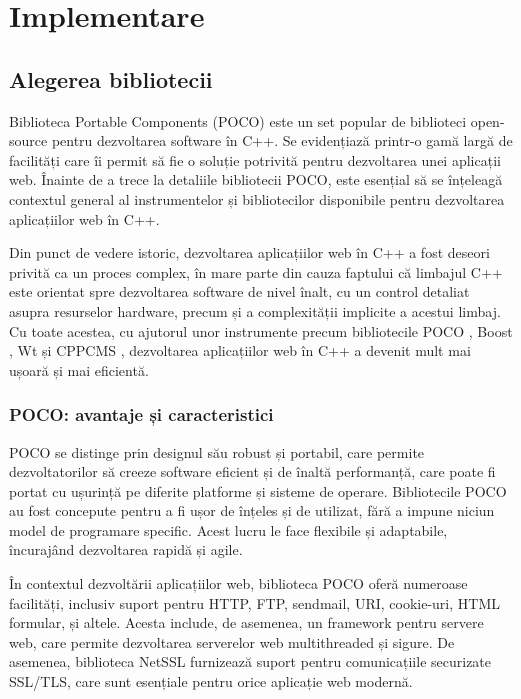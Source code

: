 \chapter{Implementare}

\section{Alegerea bibliotecii}

Biblioteca Portable Components (POCO) este un set popular de biblioteci open-source pentru dezvoltarea software în C++. Se evidențiază printr-o gamă largă de facilități care îi permit să fie o soluție potrivită pentru dezvoltarea unei aplicații web. Înainte de a trece la detaliile bibliotecii POCO, este esențial să se înțeleagă contextul general al instrumentelor și bibliotecilor disponibile pentru dezvoltarea aplicațiilor web în C++.

Din punct de vedere istoric, dezvoltarea aplicațiilor web în C++ a fost deseori privită ca un proces complex, în mare parte din cauza faptului că limbajul C++ este orientat spre dezvoltarea software de nivel înalt, cu un control detaliat asupra resurselor hardware, precum și a complexității implicite a acestui limbaj. Cu toate acestea, cu ajutorul unor instrumente precum bibliotecile POCO \cite{poco-docs}, Boost \cite{boost-docs}, Wt \cite{wt-docs} și CPPCMS \cite{cppcms-docs}, dezvoltarea aplicațiilor web în C++ a devenit mult mai ușoară și mai eficientă.

\subsection{POCO: avantaje și caracteristici}

POCO se distinge prin designul său robust și portabil, care permite dezvoltatorilor să creeze software eficient și de înaltă performanță, care poate fi portat cu ușurință pe diferite platforme și sisteme de operare. Bibliotecile POCO au fost concepute pentru a fi ușor de înțeles și de utilizat, fără a impune niciun model de programare specific. Acest lucru le face flexibile și adaptabile, încurajând dezvoltarea rapidă și agile.

În contextul dezvoltării aplicațiilor web, biblioteca POCO oferă numeroase facilități, inclusiv suport pentru HTTP, FTP, sendmail, URI, cookie-uri, HTML formular, și altele. Acesta include, de asemenea, un framework pentru servere web, care permite dezvoltarea serverelor web multithreaded și sigure. De asemenea, biblioteca NetSSL furnizează suport pentru comunicațiile securizate SSL/TLS, care sunt esențiale pentru orice aplicație web modernă.

